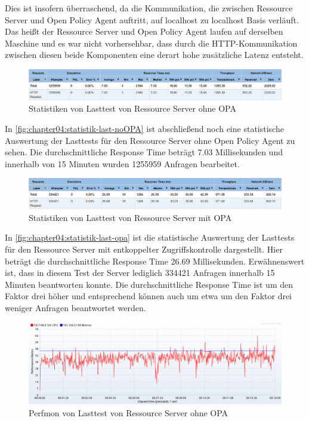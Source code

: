 Dies ist insofern überraschend, da die Kommunikation, die zwischen Ressource Server und Open Policy Agent auftritt, auf localhost zu localhost Basis verläuft. Das heißt der Ressource Server und Open Policy Agent laufen auf derselben Maschine und es war nicht vorhersehbar, dass durch die HTTP-Kommunikation zwischen diesen beide Komponenten eine derart hohe zusätzliche Latenz entsteht. 

\begin{figure}[H]
  \centering
  \includegraphics[width=1.0\textwidth]{gfx/statistik-last-noOPA.png}
  \caption{Statistiken von Lasttest von Ressource Server ohne OPA}
  \label{fig:chapter04:statistik-last-noOPA}
\end{figure}

In \autoref{fig:chapter04:statistik-last-noOPA} ist abschließend noch eine statistische Auswertung der Lasttests für den Ressource Server ohne Open Policy Agent zu sehen. Die durchschnittliche Response Time beträgt 7.03 Millisekunden und innerhalb von 15 Minuten wurden 1255959 Anfragen bearbeitet. 

\begin{figure}[H]
  \centering
  \includegraphics[width=1.0\textwidth]{gfx/statistik-last-opa.png}
  \caption{Statistiken von Lasttest von Ressource Server mit OPA}
  \label{fig:chapter04:statistik-last-opa}
\end{figure}

In \autoref{fig:chapter04:statistik-last-opa} ist die statistische Auswertung der Lasttests für den Ressource Server mit entkoppelter Zugriffskontrolle dargestellt. Hier beträgt die durchschnittliche Response Time 26.69 Millisekunden. Erwähnenswert ist, dass in diesem Test der Server lediglich 334421 Anfragen innerhalb 15 Minuten beantworten konnte. Die durchschnittliche Response Time ist um den Faktor drei höher und entsprechend können auch um etwa um den Faktor drei weniger Anfragen beantwortet werden.

\begin{figure}[H]
  \centering
  \includegraphics[width=1.0\textwidth]{gfx/perfmon-last-noOPA.png}
  \caption{Perfmon von Lasttest von Ressource Server ohne OPA}
  \label{fig:chapter04:perfmon-last-noOPA}
\end{figure}

